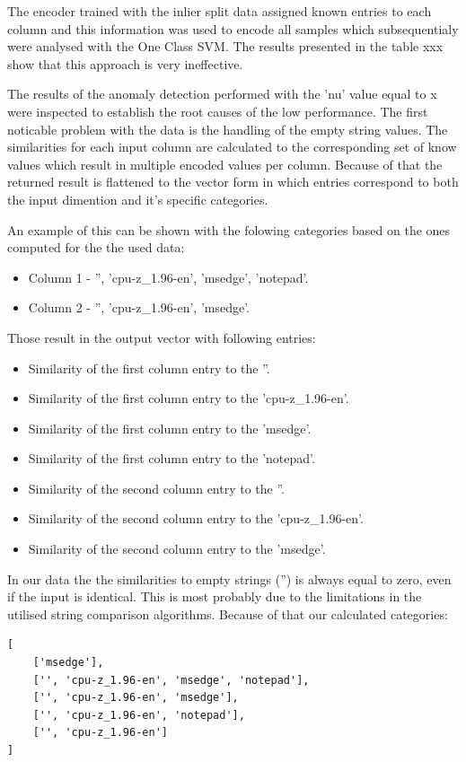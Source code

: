 \documentclass[a4paper,twoside,12pt]{book}
\begin{document}
The encoder trained with the inlier split data assigned known entries to each column and this 
information was used to encode all samples which subsequentialy were analysed with the One Class
SVM. The results presented in the table xxx show that this approach is very ineffective. 

The results of the anomaly detection performed with the 'nu' value equal to x were inspected 
to establish the root causes of the low performance. The first noticable problem with the data
is the handling of the empty string values. The similarities for each input column are 
calculated to the corresponding set of know values which result in multiple encoded values per
column. Because of that the returned result is flattened to the vector form in which entries
correspond to both the input dimention and it's specific categories. 

An example of this can be shown with the folowing categories based on the ones computed 
for the the used data:
\begin{itemize}
	\item Column 1 - '', 'cpu-z\_1.96-en', 'msedge', 'notepad'.
	\item Column 2 - '', 'cpu-z\_1.96-en', 'msedge'.
\end{itemize}

Those result in the output vector with following entries:
\begin{itemize}
	\item Similarity of the first column entry to the ''.
	\item Similarity of the first column entry to the 'cpu-z\_1.96-en'.
	\item Similarity of the first column entry to the 'msedge'.
	\item Similarity of the first column entry to the 'notepad'.
	\item Similarity of the second column entry to the ''.
	\item Similarity of the second column entry to the 'cpu-z\_1.96-en'.
	\item Similarity of the second column entry to the 'msedge'.
\end{itemize}

In our data the the similarities to empty strings ('') is always equal to zero, even if the input
is identical. This is most probably due to the limitations in the utilised string comparison
algorithms. Because of that our calculated categories:
\begin{lstlisting}
[
	['msedge'],
	['', 'cpu-z_1.96-en', 'msedge', 'notepad'],
 	['', 'cpu-z_1.96-en', 'msedge'],
	['', 'cpu-z_1.96-en', 'notepad'],
 	['', 'cpu-z_1.96-en']
]
\end{lstlisting}
\end{document}
